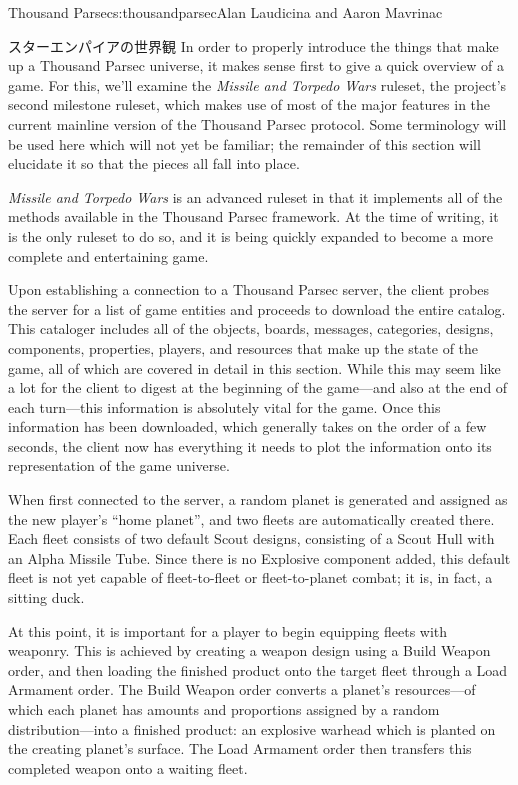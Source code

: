 \begin{aosachapter}{Thousand Parsec}{s:thousandparsec}{Alan Laudicina and Aaron Mavrinac}
\begin{aosasect1}{スターエンパイアの世界観}
In order to properly introduce the things that make up a Thousand
Parsec universe, it makes sense first to give a quick overview of a
game. For this, we'll examine the \emph{Missile and Torpedo Wars}
ruleset, the project's second milestone ruleset, which makes use of
most of the major features in the current mainline version of the
Thousand Parsec protocol. Some terminology will be used here which
will not yet be familiar; the remainder of this section will elucidate
it so that the pieces all fall into place.

\emph{Missile and Torpedo Wars} is an advanced ruleset in that it
implements all of the methods available in the Thousand Parsec
framework. At the time of writing, it is the only ruleset to do so,
and it is being quickly expanded to become a more complete and
entertaining game.

Upon establishing a connection to a Thousand Parsec server, the client
probes the server for a list of game entities and proceeds to download
the entire catalog.  This cataloger includes all of the objects,
boards, messages, categories, designs, components, properties, players,
and resources that make up the state of the game, all of which are
covered in detail in this section. While this may seem like a lot for
the client to digest at the beginning of the game---and also at the
end of each turn---this information is absolutely vital for the
game. Once this information has been downloaded, which generally takes on the order of a few seconds, the client now has
everything it needs to plot the information onto its representation of
the game universe.

When first connected to the server, a random planet is generated and
assigned as the new player's ``home planet'', and two fleets are
automatically created there. Each fleet consists of two default Scout
designs, consisting of a Scout Hull with an Alpha Missile Tube.  Since
there is no Explosive component added, this default fleet is not yet
capable of fleet-to-fleet or fleet-to-planet combat; it is, in fact, a
sitting duck.

\pagebreak

At this point, it is important for a player to begin equipping fleets
with weaponry. This is achieved by creating a weapon design using a
Build Weapon order, and then loading the finished product onto the
target fleet through a Load Armament order. The Build Weapon order
converts a planet's resources---of which each planet has amounts and
proportions assigned by a random distribution---into a finished
product: an explosive warhead which is planted on the creating
planet's surface. The Load Armament order then transfers this
completed weapon onto a waiting fleet.


\end{aosasect1}
\end{aosachapter}
